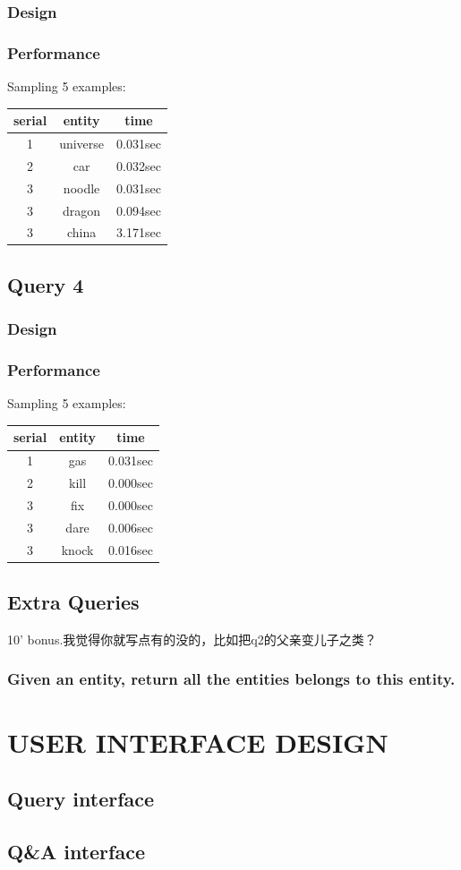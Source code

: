 \documentclass[12pt]{article}
\begin{document}
\subsubsection{Design}
\subsubsection{Performance}
Sampling 5 examples:
\begin{center}
  \begin{tabular}{ | c | c | c |}
    \hline
    serial & entity & time \\ \hline\hline
    1 & universe & 0.031sec \\ \hline
    2 & car & 0.032sec \\ \hline
    3 & noodle & 0.031sec \\ \hline
    3 & dragon & 0.094sec \\ \hline
    3 & china & 3.171sec \\
    \hline
  \end{tabular}
\end{center}
\subsection{Query 4}
\subsubsection{Design}
\subsubsection{Performance}
Sampling 5 examples:
\begin{center}
  \begin{tabular}{ | c | c | c |}
    \hline
    serial & entity & time \\ \hline\hline
    1 & gas & 0.031sec \\ \hline
    2 & kill & 0.000sec \\ \hline
    3 & fix & 0.000sec \\ \hline
    3 & dare & 0.006sec \\ \hline
    3 & knock & 0.016sec \\
    \hline
  \end{tabular}
\end{center}
\subsection{Extra Queries}
10' bonus.我觉得你就写点有的没的，比如把q2的父亲变儿子之类？
\subsubsection{Given an entity, return all the entities belongs to this entity.}
\section{USER INTERFACE DESIGN}
\subsection{Query interface}
\subsection{Q\&A interface}
\end{document}
